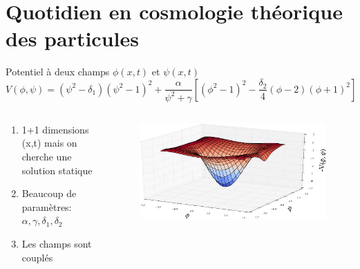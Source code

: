 \documentclass[handout]{beamer}
\begin{document}
\section{Quotidien en cosmologie théorique des particules}
\begin{frame}
\begin{block}{Potentiel à deux champs $\phi(x,t)$ et $\psi(x,t)$}
\begin{equation*}
V(\phi,\psi)=(\psi^2-\delta_1)(\psi^2-1)^2+\frac{\alpha}{\psi^2+\gamma}[(\phi^2-1)^2 - \frac{\delta_2}{4}(\phi-2)(\phi+1)^2] 
\end{equation*}

\end{block}
\begin{columns}[T]
    \begin{column}[T]{.5\linewidth}
  
\begin{enumerate}
\item 1+1 dimensions (x,t) mais on cherche une solution statique
\item Beaucoup de paramètres: $\alpha, \gamma, \delta_1, \delta_2$
\item Les champs sont couplés
\end{enumerate}  
    \end{column}
    \begin{column}[T]{.5\linewidth}
    \begin{figure}[0.3\textwidth]
    \includegraphics[scale=0.2]{Capture-2.png}
    \end{figure}
    \end{column}
  \end{columns}
\end{frame}
\end{document}
